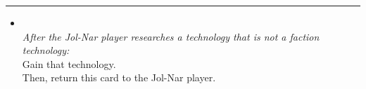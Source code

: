 \begin{multicols}{2}
\vspace{-10pt}\rule{\hsize}{0.4pt}\vspace{5pt}


\begin{itemize}
\item {}\\
\emph{After the Jol-Nar player researches a technology that is not a faction technology:}\\
Gain that technology.\\
Then, return this card to the Jol-Nar player.
\end{itemize}

\end{multicols}



